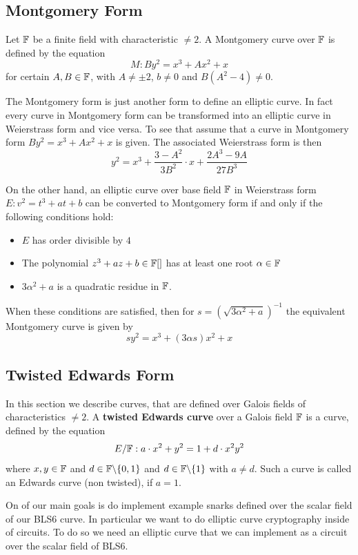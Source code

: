 \subsection{Montgomery Form}
Let $\mathbb{F}$ be a finite field with characteristic $\neq 2$. A Montgomery curve over $\mathbb{F}$ is defined by the equation
$$
M: B y^2 = x^3 + A x^2 + x 
$$
for certain $A, B \in \mathbb{F}$, with $A\neq \pm 2$, $b\neq 0$ and $B(A^2 - 4)\neq 0$. 

The Montgomery form is just another form to define an elliptic curve. In fact every curve in Montgomery form can be transformed into an elliptic curve in Weierstrass form and vice versa. To see that assume that a curve in Montgomery form $B y^2 = x^3 + A x^2 + x$ is given. The associated Weierstrass form is then
$$
y^2 = x^3 + \frac{3-A^2}{3B^2}\cdot x + \frac{2A^3-9A}{27B^3}
$$
 
On the other hand, an elliptic curve over base field $\mathbb{F}$ in Weierstrass form $E: v^2 = t^3 + a t + b$ can be converted to Montgomery form if and only if the following conditions hold:
\begin{itemize}
\item $E$ has order divisible by $4$
\item The polynomial $z^3 + a z + b \in \mathbb{F}[]$ has at least one root $\alpha\in\mathbb{F}$
\item $3\alpha^2 + a$ is a quadratic residue in $\mathbb{F}$.
\end{itemize}

When these conditions are satisfied, then for $s=({\sqrt{3\alpha^{2}+a}})^{-1}$ the equivalent Montgomery curve is given by
$$
sy^{2}=x^{3}+(3\alpha s)x^{2}+x
$$

\subsection{Twisted Edwards Form}
In this section we describe curves, that are defined over Galois fields of characteristics $\neq 2$. 
A \textbf{twisted Edwards curve} over a Galois field $\mathbb{F}$ is a curve, defined by the equation
$$E/\mathbb{F}:a\cdot x^2+y^2= 1+d\cdot x^2y^2$$ 
where $x,y\in \mathbb{F}$ and $d\in \mathbb{F}\backslash\{0,1\}$ and $d\in \mathbb{F}\backslash\{1\}$ with $a\neq d$. Such a curve is called an Edwards curve (non twisted), if $a=1$.

On of our main goals is do implement example snarks defined over the scalar field of our BLS6 curve. In particular we want to do elliptic curve cryptography inside of circuits. To do so we need an elliptic curve that we can implement as a circuit over the scalar field of BLS6. 

